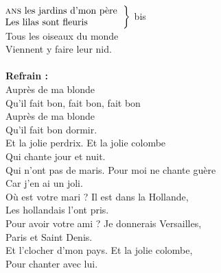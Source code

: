 
\\ 
$\left.\begin{tabular}{l}
\hspace{-0.4cm}
\textsc{ans} les jardins d'mon père 
\\
\hspace{-0.4cm}
Les lilas sont fleuris
\end{tabular}\right\rbrace$ bis
\\Tous les oiseaux du monde 
\\Viennent y faire leur nid.
\\\\\textbf{Refrain :}
\\Auprès de ma blonde 
\\Qu'il fait bon, fait bon, fait bon 
\\Auprès de ma blonde 
\\Qu'il fait bon dormir.
\\
{Et la jolie perdrix.}
Et la jolie  colombe 
\\Qui chante jour et nuit. 
\\
{Qui n'ont pas de maris.}
Pour moi ne chante guère 
\\Car j'en ai un joli. 
\\
{Où est votre mari ?}
Il est dans la Hollande, 
\\Les hollandais l'ont pris. 
\\
{Pour avoir votre ami ?}
Je donnerais Versailles,  
\\Paris et Saint Denis. 
\\
{Et l'clocher d'mon pays.}
Et la jolie colombe,
\\Pour chanter avec lui.
\\

\breakpage


